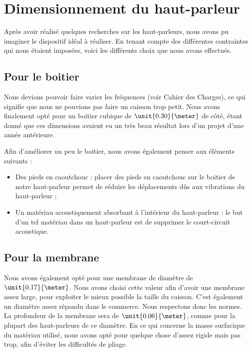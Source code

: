 

\section{Dimensionnement du haut-parleur}
Après avoir réalisé quelques recherches sur les haut-parleurs, nous avons pu imaginer le dispositif idéal à réaliser. En tenant compte des différentes contraintes qui nous étaient imposées, voici les différents choix que nous avons effectués.

\subsection{Pour le boitier}
Nous devions pouvoir faire varier les fréquences (voir Cahier des Charges), ce qui signifie que nous ne pouvions pas faire un caisson trop petit. Nous avons finalement opté pour un
boitier cubique de $\unit{0.30}{\meter}$ de côté, étant donné que ces dimensions avaient eu un très beau résultat lors d'un projet d'une année antérieure.

Afin d'améliorer un peu le boitier, nous avons également penser aux éléments suivants :

\begin{itemize}
	\item	Des pieds en caoutchouc : placer des pieds en caoutchouc sur le boitier de notre haut-parleur
				permet de réduire les déplacements dûs aux vibrations du haut-parleur ;
	\item	Un matériau acoustiquement absorbant à l'intérieur du haut-parleur : le but d'un tel matériau
				dans un haut-parleur est de supprimer le court-circuit acoustique.
\end{itemize}

\subsection{Pour la membrane}
Nous avons également opté pour une membrane de diamètre de $\unit{0.17}{\meter}$. Nous avons choisi cette valeur afin d'avoir une membrane assez large, pour exploiter le mieux possible la taille du caisson. C'est également un diamètre assez répandu dans le commerce. Nous respectons donc les normes.
La profondeur de la membrane sera de $\unit{0.06}{\meter}$, comme pour la plupart des haut-parleurs de ce diamètre. En ce qui concerne la masse surfacique du matériau utilisé, nous avons opté pour quelque chose d'assez rigide mais pas trop, afin d'éviter les difficultés de pliage.

